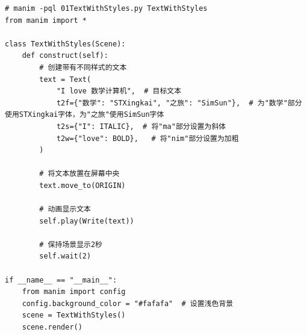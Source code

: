 \begin{lstlisting}[style=pythonstyle]
# manim -pql 01TextWithStyles.py TextWithStyles
from manim import *

class TextWithStyles(Scene):
    def construct(self):
        # 创建带有不同样式的文本
        text = Text(
            "I love 数学计算机",  # 目标文本
            t2f={"数学": "STXingkai", "之旅": "SimSun"},  # 为"数学"部分使用STXingkai字体，为"之旅"使用SimSun字体
            t2s={"I": ITALIC},  # 将"ma"部分设置为斜体
            t2w={"love": BOLD},   # 将"nim"部分设置为加粗
        )

        # 将文本放置在屏幕中央
        text.move_to(ORIGIN)

        # 动画显示文本
        self.play(Write(text))

        # 保持场景显示2秒
        self.wait(2)

if __name__ == "__main__":
    from manim import config
    config.background_color = "#fafafa"  # 设置浅色背景
    scene = TextWithStyles()
    scene.render()
\end{lstlisting}  


